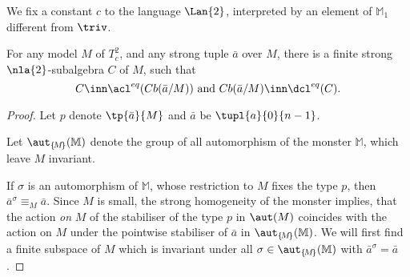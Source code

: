 \begin{lem}\label{teowei}
We fix a constant $c$ to the language $\Lan{2}$, interpreted by an element of $\mathbb{M}_{1}$ different from $\triv$.

For any model $M$ of $T^{2}_{c}$, and any strong tuple $\bar a$ over $M$,
there is a finite strong $\nla{2}$-subalgebra $C$ of $M$,
such that
$$C\inn\acl^{eq}(Cb(\bar a/M))\text{ and }Cb(\bar a/M)\inn\dcl^{eq}(C).$$
\end{lem}
\begin{proof}
Let $p$ denote $\tp{\bar a}{M}$ and $\bar a$ be $\tupl{a}{0}{n-1}$.

Let $\aut_{\{\!M\!\}}(\mathbb{M})$ denote the group of all automorphism of the monster $\mathbb{M}$,
which leave $M$ invariant.

If $\sigma$ is an automorphism of $\mathbb{M}$, whose restriction to ${M}$ fixes the type $p$,
then $\bar a^{\sigma}\equiv_{M}\bar a$.
%
Since $M$ is small, the strong homogeneity of the monster implies, that
the action {\em on} $M$ of the stabiliser of the type $p$ %
in $\aut(M)$ %
coincides with the action on $M$ %
under the pointwise stabiliser of %
$\bar a$ in $\aut_{\{\!M\!\}}(\mathbb{M})$. %
We will first find a finite subspace of $M$ which is invariant under all $\sigma\in\aut_{\{\!M\!\}}(\mathbb{M})$ with
$\bar a^{\sigma}=\bar a$.




\end{proof}
